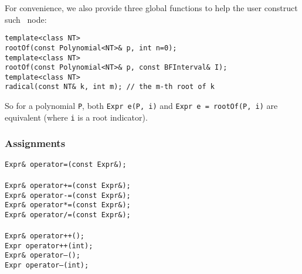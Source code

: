 For convenience, we also provide three global functions to help the user
construct such \expr\ node:

\begin{progb}{
\> \tt  template<class NT> \\
\> \> \tt  rootOf(const Polynomial<NT>\& p, int n=0); \\
\> \tt  template<class NT> \\
\> \> \tt  rootOf(const Polynomial<NT>\& p, const BFInterval\& I); \\
\> \tt  template<class NT> \\
\> \> \tt  radical(const NT\& k, int m); // the m-th root of k\\
}\end{progb}

So for a polynomial {\tt P}, both 
{\tt Expr e(P, i)} and {\tt Expr e = rootOf(P, i)} are
equivalent (where {\tt i} is a root indicator).



\bigskip	
\subsubsection{Assignments}
\begin{progb} {
\> \tt   Expr\& operator=(const Expr\&); \\ 
\\
\> \tt 	 Expr\& operator+=(const Expr\&); \\
\> \tt 	 Expr\& operator-=(const Expr\&); \\
\> \tt 	 Expr\& operator*=(const Expr\&); \\
\> \tt 	 Expr\& operator/=(const Expr\&); \\
\\
\> \tt 	 Expr\& operator++(); \\
\> \tt 	 Expr   operator++(int); \\
\> \tt 	 Expr\& operator--(); \\
\> \tt 	 Expr   operator--(int);
}\end{progb}



